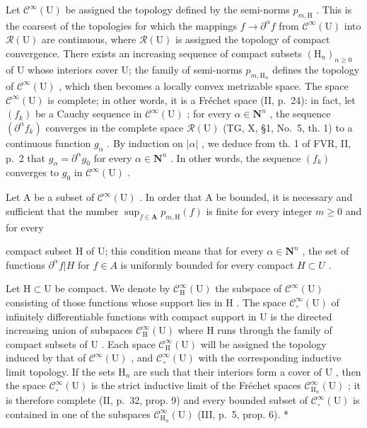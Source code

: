 Let \(\mathcal{C}^{\infty}(\mathrm{U})\) be assigned the topology defined by the semi-norms \(p_{m,\mathrm{H}}\) . This is the coarsest of the topologies for which the mappings \(f\to \partial^{\alpha}f\) from \(\mathcal{C}^{\infty}(\mathrm{U})\) into \(\mathcal{R}(\mathrm{U})\) are continuous, where \(\mathcal{R}(\mathrm{U})\) is assigned the topology of compact convergence. There exists an increasing sequence of compact subsets \((\mathrm{H}_n)_{n\geqslant 0}\) of U whose interiors cover U; the family of semi-norms \(p_{m,\mathrm{H}_n}\) defines the topology of \(\mathcal{C}^{\infty}(\mathrm{U})\) , which then becomes a locally convex metrizable space. The space \(\mathcal{C}^{\infty}(\mathrm{U})\) is complete; in other words, it is a Fréchet space (II, p.~24): in fact, let \((f_k)\) be a Cauchy sequence in \(\mathcal{C}^{\infty}(\mathrm{U})\) ; for every \(\alpha \in \mathbf{N}^n\) , the sequence \((\partial^{\alpha}f_k)\) converges in the complete space \(\mathcal{R}(\mathrm{U})\) (TG, X, §1, No.~5, th. 1) to a continuous function \(g_{\alpha}\) . By induction on \(|\alpha|\) , we deduce from th. 1 of FVR, II, p.~2 that \(g_{\alpha} = \partial^{\alpha}g_{0}\) for every \(\alpha \in \mathbf{N}^n\) . In other words, the sequence \((f_k)\) converges to \(g_0\) in \(\mathcal{C}^{\infty}(\mathrm{U})\) .

Let A be a subset of \(\mathcal{C}^{\infty}(\mathrm{U})\) . In order that A be bounded, it is necessary and sufficient that the number \(\sup_{f\in \mathbf{A}}p_{m,\mathrm{H}}(f)\) is finite for every integer \(m\geqslant 0\) and for every

  compact subset H of U; this condition means that for every \(\alpha\in \mathbf{N}^{n}\) , the set of functions \(\partial^{\alpha}f|H\) for \(f\in A\) is uniformly bounded for every compact \(H\subset U\) .

Let \(\mathrm{H} \subset \mathrm{U}\) be compact. We denote by \(\mathcal{C}_{\mathrm{H}}^{\infty}(\mathrm{U})\) the subspace of \(\mathcal{C}^{\infty}(\mathrm{U})\) consisting of those functions whose support lies in \(\mathrm{H}\) . The space \(\mathcal{C}_{\circ}^{\infty}(\mathrm{U})\) of infinitely differentiable functions with compact support in \(\mathrm{U}\) is the directed increasing union of subspaces \(\mathcal{C}_{\mathrm{H}}^{\infty}(\mathrm{U})\) where \(\mathrm{H}\) runs through the family of compact subsets of \(\mathrm{U}\) . Each space \(\mathcal{C}_{\mathrm{H}}^{\infty}(\mathrm{U})\) will be assigned the topology induced by that of \(\mathcal{C}^{\infty}(\mathrm{U})\) , and \(\mathcal{C}_{\circ}^{\infty}(\mathrm{U})\) with the corresponding inductive limit topology. If the sets \(\mathrm{H}_n\) are such that their interiors form a cover of \(\mathrm{U}\) , then the space \(\mathcal{C}_{\circ}^{\infty}(\mathrm{U})\) is the strict inductive limit of the Fréchet spaces \(\mathcal{C}_{\mathrm{H}_n}^\infty (\mathrm{U})\) ; it is therefore complete (II, p.~32, prop. 9) and every bounded subset of \(\mathcal{C}_{\circ}^{\infty}(\mathrm{U})\) is contained in one of the subspaces \(\mathcal{C}_{\mathrm{H}_n}^\infty (\mathrm{U})\) (III, p.~5, prop. 6). *

